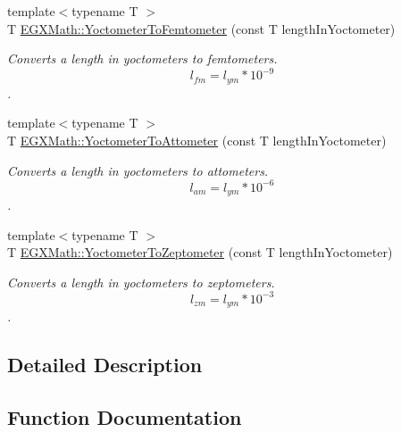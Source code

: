 \begin{DoxyCompactItemize}
{\footnotesize template$<$typename T $>$ }\\T \mbox{\hyperlink{group___e_g_x_math-_conversions-_length_conversions-_yoctometer-_s_i_ga2e4981232314be21ccfbe019886c5048}{E\+G\+X\+Math\+::\+Yoctometer\+To\+Femtometer}} (const T length\+In\+Yoctometer)
\begin{DoxyCompactList}\small\item\em Converts a length in yoctometers to femtometers. \[ l_{fm}=l_{ym} * 10^{-9} \]. \end{DoxyCompactList}\item 
{\footnotesize template$<$typename T $>$ }\\T \mbox{\hyperlink{group___e_g_x_math-_conversions-_length_conversions-_yoctometer-_s_i_ga1c259ce5be00a40690fecbc2e71083fd}{E\+G\+X\+Math\+::\+Yoctometer\+To\+Attometer}} (const T length\+In\+Yoctometer)
\begin{DoxyCompactList}\small\item\em Converts a length in yoctometers to attometers. \[ l_{am}=l_{ym} * 10^{-6} \]. \end{DoxyCompactList}\item 
{\footnotesize template$<$typename T $>$ }\\T \mbox{\hyperlink{group___e_g_x_math-_conversions-_length_conversions-_yoctometer-_s_i_gab7c5e5b6659fb99614f1e47b8033ea85}{E\+G\+X\+Math\+::\+Yoctometer\+To\+Zeptometer}} (const T length\+In\+Yoctometer)
\begin{DoxyCompactList}\small\item\em Converts a length in yoctometers to zeptometers. \[ l_{zm}=l_{ym} * 10^{-3} \]. \end{DoxyCompactList}\end{DoxyCompactItemize}


\subsection{Detailed Description}


\subsection{Function Documentation}
\mbox{\label{group___e_g_x_math-_conversions-_length_conversions-_yoctometer-_s_i_ga1c259ce5be00a40690fecbc2e71083fd}} 
